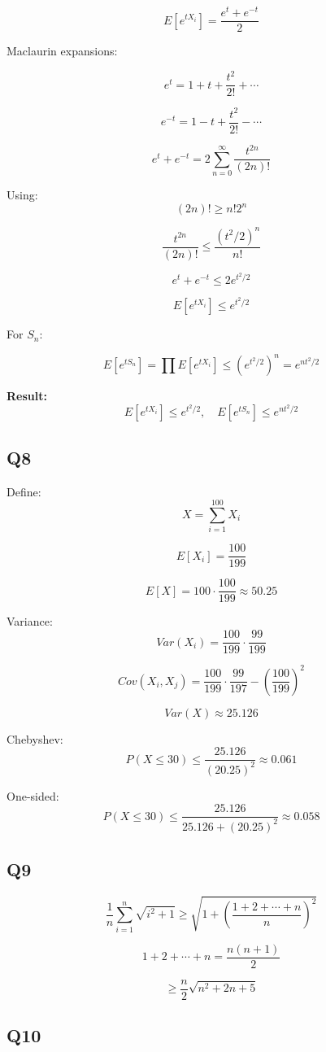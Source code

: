 \documentclass[11pt]{article}
\begin{document}
\[
E[e^{tX_i}] = \frac{e^t + e^{-t}}{2}
\]

Maclaurin expansions:

\[
e^t = 1 + t + \frac{t^2}{2!} + \cdots
\]

\[
e^{-t} = 1 - t + \frac{t^2}{2!} - \cdots
\]

\[
e^t + e^{-t} = 2\sum_{n=0}^{\infty} \frac{t^{2n}}{(2n)!}
\]

Using:
\[
(2n)! \ge n!2^n
\]

\[
\frac{t^{2n}}{(2n)!} \le \frac{(t^2/2)^n}{n!}
\]

\[
e^t + e^{-t} \le 2e^{t^2/2}
\]

\[
E[e^{tX_i}] \le e^{t^2/2}
\]

For $S_n$:

\[
E[e^{tS_n}] = \prod E[e^{tX_i}] \le (e^{t^2/2})^n = e^{nt^2/2}
\]

\textbf{Result:}
\[
E[e^{tX_i}] \le e^{t^2/2}, \quad E[e^{tS_n}] \le e^{nt^2/2}
\]

\subsection*{Q8}

Define:
\[
X = \sum_{i=1}^{100} X_i
\]

\[
E[X_i] = \frac{100}{199}
\]

\[
E[X] = 100 \cdot \frac{100}{199} \approx 50.25
\]

Variance:
\[
Var(X_i) = \frac{100}{199} \cdot \frac{99}{199}
\]

\[
Cov(X_i, X_j) = \frac{100}{199} \cdot \frac{99}{197} - \left(\frac{100}{199}\right)^2
\]

\[
Var(X) \approx 25.126
\]

Chebyshev:
\[
P(X \le 30) \le \frac{25.126}{(20.25)^2} \approx 0.061
\]

One-sided:
\[
P(X \le 30) \le \frac{25.126}{25.126 + (20.25)^2} \approx 0.058
\]

\subsection*{Q9}

\[
\frac{1}{n}\sum_{i=1}^n \sqrt{i^2+1} \ge \sqrt{1 + \left(\frac{1+2+\cdots+n}{n}\right)^2}
\]

\[
1+2+\cdots+n = \frac{n(n+1)}{2}
\]

\[
\ge \frac{n}{2}\sqrt{n^2 + 2n + 5}
\]

\subsection*{Q10}
\end{document}
